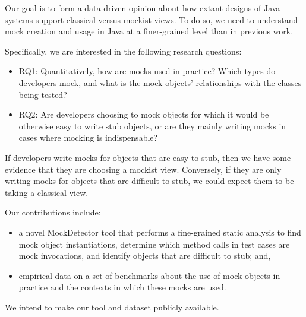 Our goal is to form a data-driven opinion about how extant designs of
Java systems support classical versus mockist views.  To do so, we
need to understand mock creation and usage in Java at a finer-grained level than in
previous work.

Specifically, we are interested in the following research questions:
\begin{itemize}
\item RQ1: Quantitatively, how are mocks used in practice? Which types do developers mock, and what is the
mock objects' relationships with the classes being tested?
\item RQ2: Are developers choosing to mock objects for which it would be otherwise easy to write stub objects, or
are they mainly writing mocks in cases where mocking is indispensable?
\end{itemize}
If developers write mocks for objects that are easy to stub, then we have some evidence that they are choosing
a mockist view. Conversely, if they are only writing mocks for objects that are difficult to stub, we could
expect them to be taking a classical view.

Our contributions include:
\begin{itemize}
\item a novel {\sc MockDetector} tool that performs a fine-grained static analysis to find mock object instantiations, determine which method calls
in test cases are mock invocations, and identify objects that are difficult to stub; and,
\item empirical data on a set of benchmarks about the use of mock objects in practice and the contexts in which these mocks are used.
\end{itemize}
We intend to make our tool and dataset publicly available.








